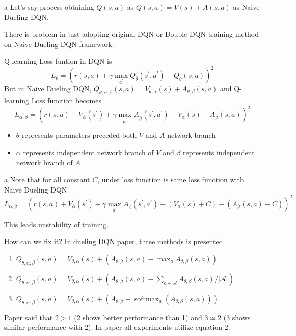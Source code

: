\documentclass[8pt]{beamer}
\newcommand{\mc}[1]{\mathcal{#1}}
\newcommand{\abs}[1]{\left\lvert #1 \right\rvert}
\newcommand{\softmax}[2]{\operatorname{softmax}_{#1}\!\left(#2\right)}
\begin{document}
\begin{frame}{a}
    Let's say process obtaining $Q(s,a)$ as $Q(s,a)= V(s) + A(s,a)$ as Naive Dueling DQN.

    There is problem in just adopting original DQN or Double DQN training method on Naive Dueling DQN framework.

    Q-learning Loss funtion in DQN is 
    \[
        L_\theta =  \left(r(s,a) + \gamma \max_{a^\prime} Q_{\bar{\theta}}(s^\prime, a^\prime) - Q_\theta(s,a) \right)^2
    \]
    But in Naive Dueling DQN, $Q_{\theta, \alpha, \beta}(s,a) = V_{\theta, \alpha}(s) + A_{\theta,\beta} (s,a)$ and Q-learning Loss function becomes
    \[
        L_{\alpha, \beta} = \left( r(s,a) + V_{\bar{\alpha}}(s^\prime) + \gamma \max_{a^\prime} A_{\bar{\beta}}(s^\prime, a^\prime) - V_\alpha (s) - A_\beta (s,a)  \right)^2
    \]
    \begin{itemize}
        \item $\theta$ represents parameters preceded both $V$ and $A$ network branch
        \item $\alpha$ represents independent network branch of $V$ and $\beta$ represents independent network branch of $A$
    \end{itemize}

\end{frame}

\begin{frame}{a}
    Note that for all constant $C$, under loss function is same loss function with Naive Dueling DQN
    \[
        L_{\alpha, \beta} = \left( r(s,a) + V_{\bar{\alpha}}(s^\prime) + \gamma \max_{a^\prime} A_{\bar{\beta}}(s^\prime, a^\prime) - (V_\alpha (s)+C) - (A_\beta (s,a)-C)  \right)^2
    \]

    This leads unstability of training.

    How can we fix it? In dueling DQN paper, three methods is presented
    \begin{enumerate}
        \item $Q_{\theta, \alpha, \beta}(s,a) = V_{\theta, \alpha} (s) + (A_{\theta, \beta}(s,a) - \max_{a}A_{\theta, \beta}(s,a))$
        \item $Q_{\theta, \alpha, \beta}(s,a) = V_{\theta, \alpha}(s) + (A_{\theta, \beta}(s,a) - \sum_{a \in \mc{A}} A_{\theta, \beta}(s,a)/\abs{\mc{A}})$
        \item $Q_{\theta, \alpha, \beta}(s,a) = V_{\theta, \alpha}(s) + (A_{\theta, \beta} - \softmax{a}{A_{\theta, \beta} (s,a)}) $
    \end{enumerate}

    Paper said that $2 > 1$ (2 shows better performance than 1) and $3 \simeq 2$ (3 shows similar performance with 2). In paper all experiments utilize equation $2$.
\end{frame}
\end{document}
